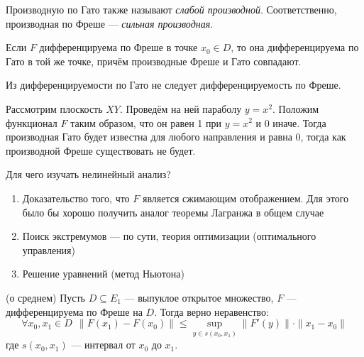 \begin{note}
	Производную по Гато также называют \textit{слабой производной}. Соответственно, производная по Фреше --- \textit{сильная производная}.
\end{note}

\begin{exercise}
	Если $F$ дифференцируема по Фреше в точке $x_0 \in D$, то она дифференцируема по Гато в той же точке, причём производные Фреше и Гато совпадают.
\end{exercise}

\begin{exercise}
	Из дифференцируемости по Гато не следует дифференцируемость по Фреше.
\end{exercise}

\begin{solution}
	Рассмотрим плоскость $XY$. Проведём на ней параболу $y = x^2$. Положим функционал $F$ таким образом, что он равен 1 при $y = x^2$ и 0 иначе. Тогда производная Гато будет известна для любого направления и равна 0, тогда как производной Фреше существовать не будет.
\end{solution}

\begin{note}
	Для чего изучать нелинейный анализ?
	\begin{enumerate}
		\item Доказательство того, что $F$ является сжимающим отображением. Для этого было бы хорошо получить аналог теоремы Лагранжа в общем случае
		
		\item Поиск экстремумов --- по сути, теория оптимизации (оптимального управления)
		
		\item Решение уравнений (метод Ньютона)
	\end{enumerate}
\end{note}

\begin{theorem} (о среднем)
	Пусть $D \subseteq E_1$ --- выпуклое открытое множество, $F$ --- дифференцируема по Фреше на $D$. Тогда верно неравенство:
	\[
		\forall x_0, x_1 \in D\ \ \|F(x_1) - F(x_0)\| \le \sup_{y \in s(x_0, x_1)} \|F'(y)\| \cdot \|x_1 - x_0\|
	\]
	где $s(x_0, x_1)$ --- интервал от $x_0$ до $x_1$.
\end{theorem}

